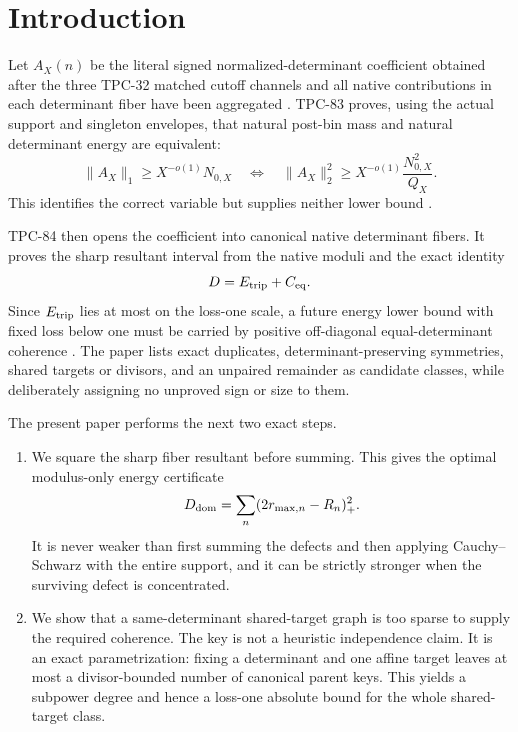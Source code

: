 \section{Introduction}
\label{sec:introduction}

Let \(A_X(n)\) be the literal signed normalized-determinant coefficient
obtained after the three TPC-32 matched cutoff channels and all native
contributions in each determinant fiber have been aggregated
\citep{WangTPC32}.  TPC-83 proves, using the actual support and
singleton envelopes, that natural post-bin mass and natural
determinant energy are equivalent:
\[
 \|A_X\|_1\ge X^{-o(1)}N_{0,X}
 \quad\Longleftrightarrow\quad
 \|A_X\|_2^2
 \ge X^{-o(1)}\frac{N_{0,X}^2}{Q_X}.
\]
This identifies the correct variable but supplies neither lower bound
\citep{WangTPC83}.

TPC-84 then opens the coefficient into canonical native determinant
fibers.  It proves the sharp resultant interval from the native
moduli and the exact identity
\[
 D=E_{\rm trip}+C_{\mathrm{eq}}.
\]
Since \(E_{\rm trip}\) lies at most on the loss-one scale, a future
energy lower bound with fixed loss below one must be carried by
positive off-diagonal equal-determinant coherence
\citep{WangTPC84}.  The paper lists exact duplicates,
determinant-preserving symmetries, shared targets or divisors, and an
unpaired remainder as candidate classes, while deliberately assigning
no unproved sign or size to them.

The present paper performs the next two exact steps.

\begin{enumerate}[leftmargin=2.2em]
\item We square the sharp fiber resultant before summing.  This gives
  the optimal modulus-only energy certificate
  \[
   D_{\mathrm{dom}}=\sum_n(2r_{\max,n}-R_n)_+^2.
  \]
  It is never weaker than first summing the defects and then applying
  Cauchy--Schwarz with the entire support, and it can be strictly
  stronger when the surviving defect is concentrated.
\item We show that a same-determinant shared-target graph is too
  sparse to supply the required coherence.  The key is not a
  heuristic independence claim.  It is an exact parametrization:
  fixing a determinant and one affine target leaves at most a
  divisor-bounded number of canonical parent keys.  This yields a
  subpower degree and hence a loss-one absolute bound for the whole
  shared-target class.
\end{enumerate}

